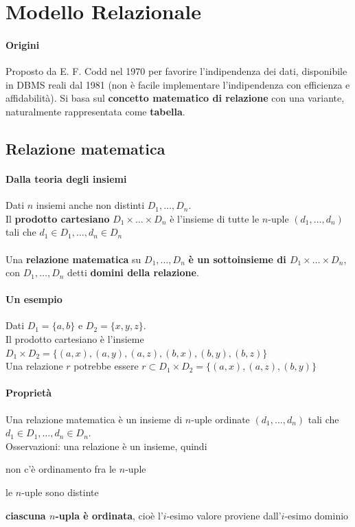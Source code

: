 \documentclass[10pt]{book}
\begin{document}
\section{Modello Relazionale}
\paragraph{Origini} Proposto da E. F. Codd nel 1970 per favorire l'indipendenza dei dati, disponibile in DBMS reali dal 1981 (non è facile implementare l'indipendenza con efficienza e affidabilità). Si basa sul \textbf{concetto matematico di relazione} con una variante, naturalmente rappresentata come \textbf{tabella}.
\subsection{Relazione matematica}
\paragraph{Dalla teoria degli insiemi} Dati $n$ insiemi anche non distinti $D_1,\ldots,D_n$.\\
Il \textbf{prodotto cartesiano} $D_1\times\ldots\times D_n$ è l'insieme di tutte le $n$-uple $(d_1,\ldots,d_n)$ tali che $d_1\in D_1, \ldots, d_n \in D_n$\\\\
Una \textbf{relazione matematica} su $D_1,\ldots, D_n$ \textbf{è un sottoinsieme di $D_1\times\ldots\times D_n$}, con $D_1,\ldots, D_n$ detti \textbf{domini della relazione}.
\paragraph{Un esempio} Dati $D_1 = \{a, b\}$ e $D_2 = \{x, y, z\}$.\\
Il prodotto cartesiano è l'insieme $D_1\times D_2 = \{(a,x),(a,y),(a,z),(b,x),(b,y),(b,z)\}$\\
Una relazione $r$ potrebbe essere $r\subset D_1\times D_2 = \{(a,x),(a,z),(b,y)\}$
\paragraph{Proprietà} Una relazione matematica è un insieme di $n$-uple ordinate $(d_1,\ldots,d_n)$ tali che $d_1\in D_1, \ldots, d_n \in D_n$.\\
Osservazioni: una relazione è un insieme, quindi
\begin{list}{}{}
	\item non c'è ordinamento fra le $n$-uple
	\item le $n$-uple sono distinte
	\item \textbf{ciascuna $n$-upla è ordinata}, cioè l'$i$-esimo valore proviene dall'$i$-esimo dominio
\end{list}
\end{document}
